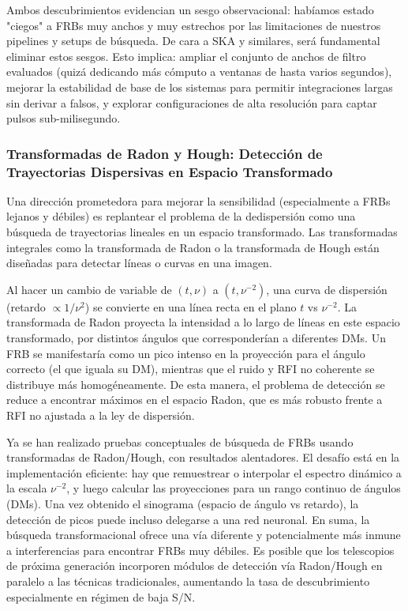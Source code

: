 Ambos descubrimientos evidencian un sesgo observacional: habíamos estado "ciegos" a FRBs muy anchos y muy estrechos por las limitaciones de nuestros pipelines y setups de búsqueda. De cara a SKA y similares, será fundamental eliminar estos sesgos. Esto implica: ampliar el conjunto de anchos de filtro evaluados (quizá dedicando más cómputo a ventanas de hasta varios segundos), mejorar la estabilidad de base de los sistemas para permitir integraciones largas sin derivar a falsos, y explorar configuraciones de alta resolución para captar pulsos sub-milisegundo.

\subsubsection{Transformadas de Radon y Hough: Detección de Trayectorias Dispersivas en Espacio Transformado}

Una dirección prometedora para mejorar la sensibilidad (especialmente a FRBs lejanos y débiles) es replantear el problema de la dedispersión como una búsqueda de trayectorias lineales en un espacio transformado. Las transformadas integrales como la transformada de Radon o la transformada de Hough están diseñadas para detectar líneas o curvas en una imagen.

Al hacer un cambio de variable de $(t, \nu)$ a $(t, \nu^{-2})$, una curva de dispersión (retardo $\propto 1/\nu^2$) se convierte en una línea recta en el plano $t$ vs $\nu^{-2}$. La transformada de Radon proyecta la intensidad a lo largo de líneas en este espacio transformado, por distintos ángulos que corresponderían a diferentes DMs. Un FRB se manifestaría como un pico intenso en la proyección para el ángulo correcto (el que iguala su DM), mientras que el ruido y RFI no coherente se distribuye más homogéneamente. De esta manera, el problema de detección se reduce a encontrar máximos en el espacio Radon, que es más robusto frente a RFI no ajustada a la ley de dispersión.

Ya se han realizado pruebas conceptuales de búsqueda de FRBs usando transformadas de Radon/Hough, con resultados alentadores. El desafío está en la implementación eficiente: hay que remuestrear o interpolar el espectro dinámico a la escala $\nu^{-2}$, y luego calcular las proyecciones para un rango continuo de ángulos (DMs). Una vez obtenido el sinograma (espacio de ángulo vs retardo), la detección de picos puede incluso delegarse a una red neuronal. En suma, la búsqueda transformacional ofrece una vía diferente y potencialmente más inmune a interferencias para encontrar FRBs muy débiles. Es posible que los telescopios de próxima generación incorporen módulos de detección vía Radon/Hough en paralelo a las técnicas tradicionales, aumentando la tasa de descubrimiento especialmente en régimen de baja S/N.


